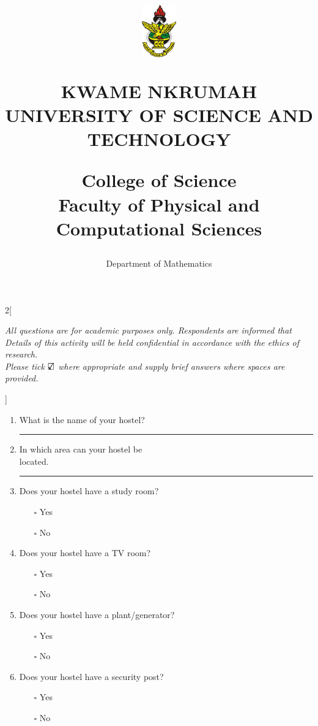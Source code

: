 \documentclass[12pt,a4paper]{article}
\title{\begin{minipage}{2.3cm}
			\includegraphics[width=1.5cm]{logo}
		\end{minipage}
		\begin{minipage}{13.5cm}\raggedright
			\textbf{KWAME NKRUMAH UNIVERSITY OF SCIENCE AND TECHNOLOGY}
		\end{minipage}
	\vspace{-1.5ex}
	\begin{center}
		\LARGE \textbf{College of Science}	
		\\ Faculty of Physical and Computational Sciences
	\end{center}
\vspace{-1.3ex}}
\author{\large Department of Mathematics}
\date{}
\begin{document}
	\maketitle
	
	\vspace{-3.5ex}

\begin{multicols}{2}[	\begin{flushleft}
		\textsl{All questions are for academic purposes only. Respondents are informed that Details of this activity will be held confidential in accordance with the ethics of research.} \\ \vspace{0.2cm}
		\textsl{Please tick $\text{\rlap{$\checkmark$}}\square$ where appropriate and supply brief answers where spaces are provided.}
	\end{flushleft}
]	
	\begin{enumerate}

		\item What is the name of your hostel?
		\\ \rule[-0.3cm]{6.7cm}{0.1mm}
		
		\item In which area can your hostel be \\located.
		\\ \rule[-0.3cm]{6.7cm}{0.1mm}
		
		\item Does your hostel have a study room?
			\begin{itemize}
				\item[$\square$] Yes
				\item[$\square$] No
			\end{itemize} 
		
		\item Does your hostel have a TV room?
			\begin{itemize}
				\item[$\square$] Yes
				\item[$\square$] No
			\end{itemize}

		\item Does your hostel have a plant/generator?
			\begin{itemize}
				\item[$\square$] Yes
				\item[$\square$] No
			\end{itemize}
		
		\item Does your hostel have a security post?
			\begin{itemize}
				\item[$\square$] Yes
				\item[$\square$] No
			\end{itemize}
		

\end{enumerate}
\end{multicols}
\end{document}

